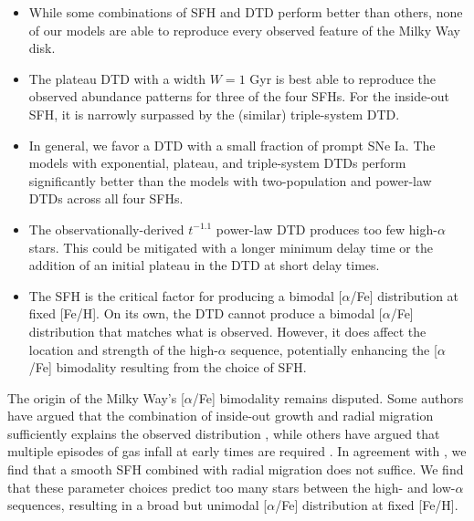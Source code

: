 \documentclass[twocolumn,twocolappendix]{aastex631}
\newcommand{\aFe}{[$\alpha$/Fe]\xspace}
\begin{document}
\begin{itemize}
    \item While some combinations of SFH and DTD perform better than others, none of our models are able to reproduce every observed feature of the Milky Way disk.
    
    \item The plateau DTD with a width $W=1$ Gyr is best able to reproduce the observed abundance patterns for three of the four SFHs. For the inside-out SFH, it is narrowly surpassed by the (similar) triple-system DTD.

    \item In general, we favor a DTD with a small fraction of prompt SNe Ia. The models with exponential, plateau, and triple-system DTDs perform significantly better than the models with two-population and power-law DTDs across all four SFHs.

    \item The observationally-derived $t^{-1.1}$ power-law DTD produces too few high-$\alpha$ stars. This could be mitigated with a longer minimum delay time or the addition of an initial plateau in the DTD at short delay times.
    
    \item The SFH is the critical factor for producing a bimodal \aFe distribution at fixed [Fe/H]. On its own, the DTD cannot produce a bimodal \aFe distribution that matches what is observed. However, it does affect the location and strength of the high-$\alpha$ sequence, potentially enhancing the \aFe bimodality resulting from the choice of SFH.
\end{itemize}

The origin of the Milky Way's \aFe bimodality remains disputed. Some authors have argued that the combination of inside-out growth and radial migration sufficiently explains the observed distribution \citep[e.g.,][]{Kubryk2015-RadialMigrationEvolution,Sharma2021-RadialMigration,Chen2023-RadialMixingRedux,Prantzos2023-ThinThickDisks}, while others have argued that multiple episodes of gas infall at early times are required \citep[e.g.,][]{Chiappini1997-TwoInfall,Mackereth2018-AlphaBimodality,Spitoni2019-TwoInfall,Spitoni2020-TwoInfall,Spitoni2021-TwoInfall}. In agreement with , we find that a smooth SFH combined with radial migration does not suffice. We find that these parameter choices predict too many stars between the high- and low-$\alpha$ sequences, resulting in a broad but unimodal \aFe distribution at fixed [Fe/H].
\end{document}
